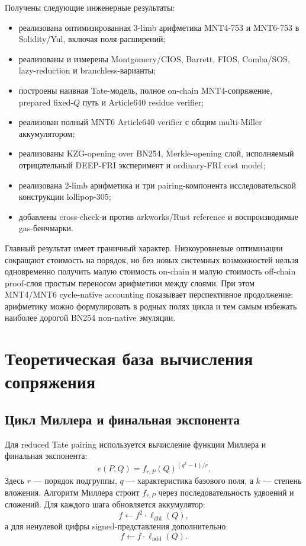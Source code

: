 \documentclass[12pt,a4paper]{article}
\begin{document}
Получены следующие инженерные результаты:
\begin{itemize}
    \item реализована оптимизированная 3-limb арифметика MNT4-753 и MNT6-753
    в Solidity/Yul, включая поля расширений;
    \item реализованы и измерены Montgomery/CIOS, Barrett, FIOS, Comba/SOS,
    lazy-reduction и branchless-варианты;
    \item построены наивная Tate-модель, полное on-chain MNT4-сопряжение,
    prepared fixed-$Q$ путь и Article640 residue verifier;
    \item реализован полный MNT6 Article640 verifier с общим multi-Miller
    аккумулятором;
    \item реализованы KZG-opening over BN254, Merkle-opening слой,
    исполняемый отрицательный DEEP-FRI эксперимент и ordinary-FRI cost model;
    \item реализована 2-limb арифметика и три pairing-компонента
    исследовательской конструкции lollipop-305;
    \item добавлены cross-check-и против arkworks/Rust reference и
    воспроизводимые gas-бенчмарки.
\end{itemize}

Главный результат имеет граничный характер. Низкоуровневые оптимизации
сокращают стоимость на порядок, но без новых системных возможностей нельзя
одновременно получить малую стоимость on-chain и малую стоимость off-chain
proof-слоя простым переносом арифметики между слоями. При этом
MNT4/MNT6 cycle-native accounting показывает перспективное продолжение:
арифметику можно формулировать в родных полях цикла и тем самым избежать
наиболее дорогой BN254 non-native эмуляции.

\section{Теоретическая база вычисления сопряжения}

\subsection{Цикл Миллера и финальная экспонента}

Для reduced Tate pairing используется вычисление функции Миллера и финальная
экспонента:
\[
    e(P,Q)=f_{r,P}(Q)^{(q^k-1)/r}.
\]
Здесь $r$ --- порядок подгруппы, $q$ --- характеристика базового поля, а $k$ ---
степень вложения. Алгоритм Миллера строит $f_{r,P}$ через последовательность
удвоений и сложений. Для каждого шага обновляется аккумулятор:
\[
    f \leftarrow f^2\cdot \ell_{\mathrm{dbl}}(Q),
\]
а для ненулевой цифры signed-представления дополнительно:
\[
    f \leftarrow f\cdot \ell_{\mathrm{add}}(Q).
\]
\end{document}
